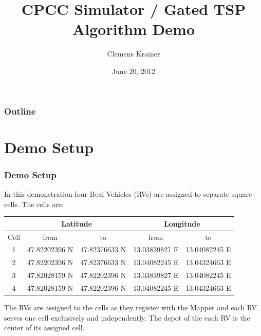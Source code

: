 \documentclass{beamer}
\title{CPCC Simulator / Gated TSP Algorithm Demo}
\author{Clemens Krainer}
\institute[University of Salzburg]
{
Department of Computer Sciences\\
University of Salzburg, Austria
}
\date{June 20, 2012}
\begin{document}
\begin{frame}
        \titlepage
\end{frame}

\begin{frame}
        \frametitle{Outline}
        \tableofcontents
\end{frame}


\section{Demo Setup}


\begin{frame}\frametitle{Demo Setup} %
In this demonstration four Real Vehicles (RVs) are assigned to separate square
cells. The cells are:
\vspace{0.5cm}

\begin{tabular}{|c|c|c|c|c|}
\hline
     & \multicolumn{2}{|c|}{Latitude} & \multicolumn{2}{|c|}{Longitude} \\
\hline
Cell & from    & to       & from      & to \\
\hline
 1   & 47.82202396 N & 47.82376633 N & 13.03839827 E & 13.04082245 E \\
\hline
 2   & 47.82202396 N & 47.82376633 N & 13.04082245 E & 13.04324663 E \\
\hline
 3   & 47.82028159 N & 47.82202396 N & 13.03839827 E & 13.04082245 E \\
\hline
 4   & 47.82028159 N & 47.82202396 N & 13.04082245 E & 13.04324663 E \\
\hline 
\end{tabular}

\vspace{0.5cm}
The RVs are assigned to the cells as they register with the Mapper
and each RV serves one cell exclusively and independently.  The
depot of the each RV is the center of its assigned cell.
\end{frame}
\end{document}
